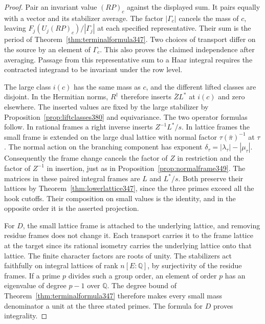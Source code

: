 \documentclass[a4paper,11pt]{article}
\theoremstyle{definition}
\theoremstyle{remark}
\numberwithin{equation}{section}
\begin{document}
\begin{proof}
Pair an invariant value \((RP)_c\) against the displayed sum.
It pairs equally with a vector and its stabilizer average.
The factor \(|\Gamma_c|\) cancels the mass of \(c\), leaving
\(F_j(U_j(RP)_c)/|\Gamma_j|\) at each specified representative.
Their sum is the period of Theorem~\ref{thm:terminalformula347}.
Two choices of transport differ on the source by an element
of \(\Gamma_c\). This also proves the claimed independence after
averaging. Passage from this representative sum to a Haar integral
requires the contracted integrand to be invariant under the row level.

The large class \(i(c)\) has the same mass as \(c\), and the
different lifted classes are disjoint. In the Hermitian norms,
\(R^\dagger\) therefore inserts \(\bar Z L^*\) at \(i(c)\)
and zero elsewhere. The inserted values are fixed by the large
stabilizer by Proposition~\ref{prop:liftclasses380} and
equivariance. The two operator formulas follow. In rational
frames a right inverse inserts \(Z^{-1}L^*/s\). In lattice frames
the small frame is extended on the large dual lattice with
normal factor \(\tau(\bar\pi)^{-1}\) at \(\tau\).
The normal action on the branching component has exponent
\(\delta_\tau=|\lambda_\tau|-|\mu_\tau|\).
Consequently the frame change cancels the factor of \(Z\) in
restriction and the factor of \(Z^{-1}\) in insertion, just as in
Proposition~\ref{prop:normalframe349}. The matrices in these
paired integral frames are \(L\) and \(L^*/s\). Both preserve
their lattices by Theorem~\ref{thm:lowerlattice347}, since the
three primes exceed all the hook cutoffs. Their composition on
small values is the identity, and in the opposite order it is
the asserted projection.

For \(D\), the small lattice frame is attached to the underlying
lattice, and removing residue frames does not change it. Each
transport carries it to the frame lattice at the target since
its rational isometry carries the underlying lattice onto that
lattice. The finite character factors are roots of unity.
The stabilizers act faithfully on integral lattices of rank
\(n[E:\mathbb Q]\), by surjectivity of the residue frames.
If a prime \(p\) divides such a group order, an element of order
\(p\) has an eigenvalue of degree \(p-1\) over \(\mathbb Q\).
The degree bound of Theorem~\ref{thm:terminalformula347}
therefore makes every small mass denominator a unit at the
three stated primes. The formula for \(D\) proves integrality.
\end{proof}
\end{document}
